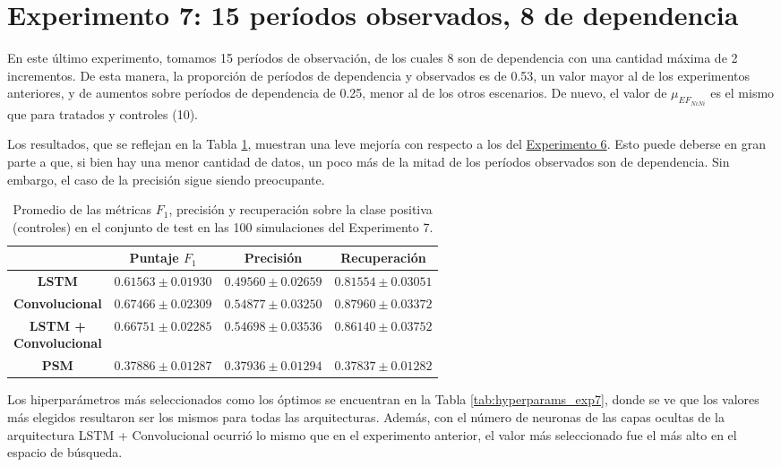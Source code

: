 \documentclass[../../main.tex]{subfiles}
\begin{document}
\section{Experimento 7: 15 períodos observados, 8 de dependencia} \label{sec:exp7}
En este último experimento, tomamos 15 períodos de observación, de los cuales 8 son de
dependencia con una cantidad máxima de 2 incrementos. De esta manera, la proporción de
períodos de dependencia y observados es de 0.53, un valor mayor al de los experimentos
anteriores, y de aumentos sobre períodos de dependencia de 0.25, menor al de los otros
escenarios. De nuevo, el valor de \(\mu_{{EF}_{NiNi}}\) es el mismo que para tratados
y controles (10).

Los resultados, que se reflejan en la Tabla \ref{tab:results_exp7}, muestran una leve
mejoría con respecto a los del \hyperref[sec:exp6]{Experimento 6}. Esto puede deberse en
gran parte a que, si bien hay una menor cantidad de datos, un poco más de la mitad de los
períodos observados son de dependencia. Sin embargo, el caso de la precisión sigue siendo
preocupante.

\begin{table}[H]
    \centering
    \renewcommand{\arraystretch}{1.2}
    \label{tab:results_exp7}
    \begin{tabular}{|c|c|c|c|}
        \hline
         & \textbf{Puntaje} \(F_1\) & \textbf{Precisión} & \textbf{Recuperación} \\ \hline\hline
        \textbf{LSTM}
            & $0.61563 \pm 0.01930$ & $0.49560 \pm 0.02659$ & $0.81554 \pm 0.03051$ \\ \hline
        \textbf{Convolucional}
            & $\mathbf{0.67466 \pm 0.02309}$ & $\mathbf{0.54877 \pm 0.03250}$ & $\mathbf{0.87960 \pm 0.03372}$ \\ \hline
        \makecell{\textbf{LSTM +} \\ \textbf{Convolucional}}
            & $0.66751 \pm 0.02285$ & $0.54698 \pm 0.03536$ & $0.86140 \pm 0.03752$ \\ \hline
        \textbf{PSM}
            & $0.37886 \pm 0.01287$ & $0.37936 \pm 0.01294$ & $0.37837 \pm 0.01282$ \\
        \hline
    \end{tabular}
    \caption{Promedio de las métricas \(F_1\), precisión y recuperación sobre la
    clase positiva (controles) en el conjunto de test en las 100 simulaciones del
    Experimento 7.}
\end{table}

Los hiperparámetros más seleccionados como los óptimos se encuentran en la Tabla
\ref{tab:hyperparams_exp7}, donde se ve que los valores más elegidos resultaron ser los
mismos para todas las arquitecturas. Además, con el número de neuronas de las capas
ocultas de la arquitectura LSTM + Convolucional ocurrió lo mismo que en el experimento
anterior, el valor más seleccionado fue el más alto en el espacio de búsqueda.
\end{document}
